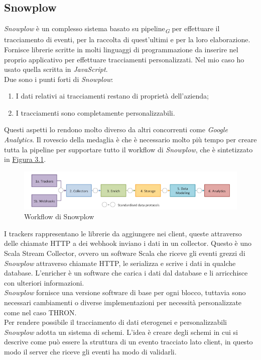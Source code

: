 \documentclass[a4paper, 12pt, twoside, openright]{book}
\newcommand{\gloss}[1]{#1\textsubscript{\textit{\tiny{G}}}}
\begin{document}
\subsection{Snowplow}
\label{snowplow}
\textit{Snowplow} è un complesso sistema basato su \gloss{pipeline} per effettuare il tracciamento di eventi, per la raccolta di quest'ultimi e per la loro elaborazione.\\
Fornisce librerie scritte in molti linguaggi di programmazione da inserire nel proprio applicativo per effettuare tracciamenti personalizzati. Nel mio caso ho usato quella scritta in \textit{JavaScript}.\\
Due sono i punti forti di \textit{Snowplow}: 
\begin{enumerate}
	\item I dati relativi ai tracciamenti restano di proprietà dell'azienda;
	\item I tracciamenti sono completamente personalizzabili.
\end{enumerate}
Questi aspetti lo rendono molto diverso da altri concorrenti come \textit{Google Analytics}. Il rovescio della medaglia è che è necessario molto più tempo per creare tutta la pipeline per supportare tutto il workflow di \textit{Snowplow}, che è sintetizzato in \hyperref[snowplow-workflow]{Figura 3.1}.
\begin{figure}[H]
	\centering
	\label{snowplow-workflow}
	\includegraphics[width=1.0\textwidth]{images/snowplow-workflow.png}
	\caption{Workflow di Snowplow}
\end{figure} 
I trackers rappresentano le librerie da aggiungere nei client, queste attraverso delle chiamate HTTP a dei webhook inviano i dati in un collector. Questo è uno Scala Stream Collector, ovvero un software Scala che riceve gli eventi grezzi di \textit{Snowplow} attraverso chiamate HTTP, le serializza e scrive i dati in qualche database. L'enricher è un software che carica i dati dal database e li arricchisce con ulteriori informazioni.\\
\textit{Snowplow} fornisce una versione software di base per ogni blocco, tuttavia sono necessari cambiamenti o diverse implementazioni per necessità personalizzate come nel caso THRON.\\
Per rendere possibile il tracciamento di dati eterogenei e personalizzabili \textit{Snowplow} adotta un sistema di schemi. L'idea è creare degli schemi in cui si descrive come può essere la struttura di un evento tracciato lato client, in questo modo il server che riceve gli eventi ha modo di validarli.\\ 
\end{document}
